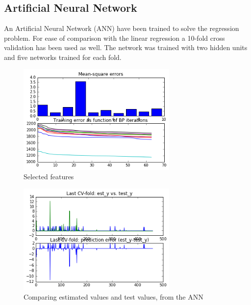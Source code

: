 \subsection{Artificial Neural Network}
An Artificial Neural Network (ANN) have been trained to solve the regression problem. For ease of comparison with the linear regression a 10-fold cross validation has been used as well. The network was trained with two hidden units and five networks trained for each fold.

\vspace{-5pt}
\begin{figure}[!ht]
	\centering
	\includegraphics[width=0.7\textwidth]{Fig/regression_ANN_1.png}
	\vspace{-5pt}
	\caption{Selected features}
	\label{fig:selected_features}
\end{figure}

\vspace{-5pt}
\begin{figure}[!ht]
	\centering
	\includegraphics[width=0.7\textwidth]{Fig/regression_ANN_2.png}
	\vspace{-5pt}
	\caption{Comparing estimated values and test values, from the ANN}
	\label{fig:estimated_vs_test_values_ANN}
\end{figure}